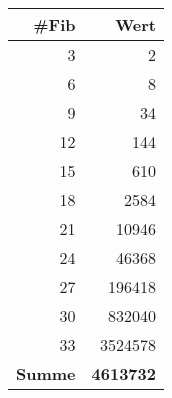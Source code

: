 \begin{center}
\small\renewcommand{\arraystretch}{1.4}
\small
{} %
\begin{tabularx}{0.25\textwidth}{rr}
\rowcolor{tableheadcolor}
\hline
\textbf{\#Fib} & \textbf{Wert} \\
\hline
3 & 2 \\
6 & 8 \\
9 & 34 \\
12 & \num{144} \\
15 & \num{610} \\
18 & \num{2584} \\
21 & \num{10946} \\
24 & \num{46368} \\
27 & \num{196418} \\
30 & \num{832040} \\
33 & \num{3524578} \\
\hline
\rowcolor{tablesubheadcolor}
\textbf{Summe} & \textbf{\num{4613732}}\\
\hline
\end{tabularx}
\end{center}
